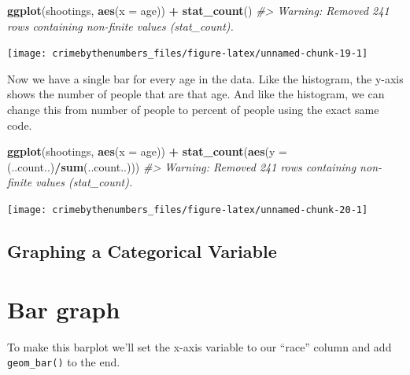 \documentclass[
  12pt,
]{book}
\newenvironment{Shaded}{\begin{snugshade}}{\end{snugshade}}
\newcommand{\CommentTok}[1]{\textcolor[rgb]{0.37,0.37,0.37}{\textit{#1}}}
\newcommand{\DataTypeTok}[1]{\textcolor[rgb]{0.27,0.27,0.27}{#1}}
\newcommand{\KeywordTok}[1]{\textcolor[rgb]{0.27,0.27,0.27}{\textbf{#1}}}
\newcommand{\NormalTok}[1]{#1}
\newcommand{\OperatorTok}[1]{\textcolor[rgb]{0.43,0.43,0.43}{\textbf{#1}}}
\newcommand{\StringTok}[1]{\textcolor[rgb]{0.5,0.5,0.5}{#1}}
\begin{document}
\begin{Shaded}
\begin{Highlighting}[]
\KeywordTok{ggplot}\NormalTok{(shootings, }\KeywordTok{aes}\NormalTok{(}\DataTypeTok{x =}\NormalTok{ age)) }\OperatorTok{+}\StringTok{ }
\StringTok{  }\KeywordTok{stat\_count}\NormalTok{()}
\CommentTok{\#> Warning: Removed 241 rows containing non{-}finite values (stat\_count).}
\end{Highlighting}
\end{Shaded}

\begin{center}\texttt{[image: crimebythenumbers\_files/figure-latex/unnamed-chunk-19-1]} \end{center}

Now we have a single bar for every age in the data. Like the histogram, the y-axis shows the number of people that are that age. And like the histogram, we can change this from number of people to percent of people using the exact same code.

\begin{Shaded}
\begin{Highlighting}[]
\KeywordTok{ggplot}\NormalTok{(shootings, }\KeywordTok{aes}\NormalTok{(}\DataTypeTok{x =}\NormalTok{ age)) }\OperatorTok{+}\StringTok{ }
\StringTok{  }\KeywordTok{stat\_count}\NormalTok{(}\KeywordTok{aes}\NormalTok{(}\DataTypeTok{y =}\NormalTok{ (..count..)}\OperatorTok{/}\KeywordTok{sum}\NormalTok{(..count..)))}
\CommentTok{\#> Warning: Removed 241 rows containing non{-}finite values (stat\_count).}
\end{Highlighting}
\end{Shaded}

\begin{center}\texttt{[image: crimebythenumbers\_files/figure-latex/unnamed-chunk-20-1]} \end{center}

\hypertarget{graphing-a-categorical-variable}{%
\subsection{Graphing a Categorical Variable}\label{graphing-a-categorical-variable}}

\hypertarget{bar-graph}{%
\section{Bar graph}\label{bar-graph}}

To make this barplot we'll set the x-axis variable to our ``race'' column and add \texttt{geom\_bar()} to the end.
\end{document}
